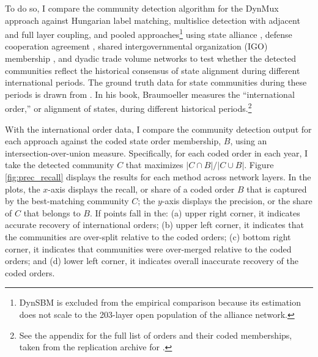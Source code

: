 \documentclass[11pt, letterpaper]{article}
\begin{document}
To do so, I compare the community detection algorithm for the DynMux approach against Hungarian label matching, multislice detection with adjacent and full layer coupling, and pooled approaches\footnote{DynSBM is excluded from the empirical comparison because its estimation does not scale to the 203-layer open population of the alliance network.} using state alliance \citep{leeds2002alliance}, defense cooperation agreement \citep{kinne2020defense}, shared intergovernmental organization (IGO) membership \citep{pevehouse2020tracking, wallace1970intergovernmental}, and dyadic trade volume \citep{barbieri2009trading} networks to test whether the detected communities reflect the historical consensus of state alignment during different international periods. The ground truth data for state communities during these periods is drawn from \cite{braumoeller2019only}. In his book, Braumoeller measures the ``international order,'' or alignment of states, during different historical periods.\footnote{See the appendix for the full list of orders and their coded memberships, taken from the replication archive for \cite{braumoeller2019only}.} 

With the international order data, I compare the community detection output for each approach against the coded state order membership, $B$, using an intersection-over-union measure. Specifically, for each coded order in each year, I take the detected community $C$ that maximizes $|C\cap B|/|C\cup B|$. Figure \ref{fig:prec_recall} displays the results for each method across network layers. In the plots, the $x$-axis displays the recall, or share of a coded order $B$ that is captured by the best-matching community $C$; the $y$-axis displays the precision, or the share of $C$ that belongs to $B$. If points fall in the: (a) upper right corner, it indicates accurate recovery of international orders; (b) upper left corner, it indicates that the communities are over-split relative to the coded orders; (c) bottom right corner, it indicates that communities were over-merged relative to the coded orders; and (d) lower left corner, it indicates overall inaccurate recovery of the coded orders. 
\end{document}
